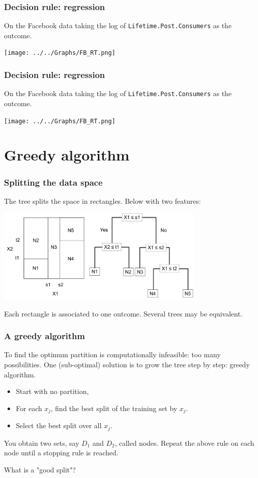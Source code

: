 \begin{frame}
\frametitle{Decision rule: regression}
On the Facebook data taking the log of {\tt Lifetime.Post.Consumers} as the outcome.
\begin{center}
\texttt{[image: ../../Graphs/FB\_RT.png]}
\end{center}
\end{frame}
\begin{frame}
\frametitle{Decision rule: regression}
On the Facebook data taking the log of {\tt Lifetime.Post.Consumers} as the outcome.
\begin{center}
\texttt{[image: ../../Graphs/FB\_RT.png]}
\end{center}
\end{frame}
\section{Greedy algorithm}
\begin{frame}
\frametitle{Splitting the data space}
The tree splits the space in rectangles. Below with two features:
\begin{center}
\includegraphics[width=10cm]{../../Graphs/CART_Picture.png}
\end{center}
Each rectangle is associated to one outcome. Several trees may be equivalent.
\end{frame}
\begin{frame}
\frametitle{A greedy algorithm}
To find the optimum partition is computationally infeasible: too many possibilities. One (sub-optimal) solution is to grow the tree step by step: greedy algorithm.
\begin{itemize}
\item Start with no partition, 
\item For each $x_j$, find the best split of the training set by $x_j$.
\item Select the best split over all $x_j$.  
\end{itemize}
You obtain two sets, say $D_1$ and $D_2$, called nodes. Repeat the above rule on each node until a stopping rule is reached.\\
\vspace{0.5cm}
\centerline{What is a "good split"?}
\end{frame}

